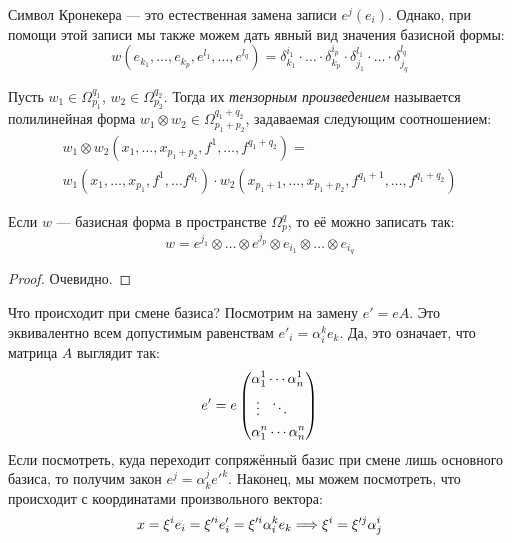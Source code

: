 \begin{note}
	Символ Кронекера --- это естественная замена записи $e^j(e_i)$. Однако, при помощи этой записи мы также можем дать явный вид значения базисной формы:
	\[
		w(e_{k_1}, \ldots, e_{k_p}, e^{l_1}, \ldots, e^{l_q}) = \delta_{k_1}^{i_1} \cdot \ldots \cdot \delta_{k_p}^{i_p} \cdot \delta_{j_1}^{l_1} \cdot \ldots \cdot \delta_{j_q}^{l_q}
	\]
\end{note}

\begin{definition}
	Пусть $w_1 \in \Omega_{p_1}^{q_1}$, $w_2 \in \Omega_{p_2}^{q_2}$. Тогда их \textit{тензорным произведением} называется полилинейная форма $w_1 \otimes w_2 \in \Omega_{p_1 + p_2}^{q_1 + q_2}$, задаваемая следующим соотношением:
	\begin{multline*}
		w_1 \otimes w_2(x_1, \ldots, x_{p_1 + p_2}, f^1, \ldots, f^{q_1 + q_2}) =
		\\
		w_1(x_1, \ldots, x_{p_1}, f^1, \ldots f^{q_1}) \cdot w_2(x_{p_1 + 1}, \ldots, x_{p_1 + p_2}, f^{q_1 + 1}, \ldots, f^{q_1 + q_2})
	\end{multline*}
\end{definition}

\begin{proposition}
	Если $w$ --- базисная форма в пространстве $\Omega_p^q$, то её можно записать так:
	\[
		w = e^{j_1} \otimes \ldots \otimes e^{j_p} \otimes e_{i_1} \otimes \ldots \otimes e_{i_q}
	\]
\end{proposition}

\begin{proof}
	Очевидно.
\end{proof}

\begin{note}
	Что происходит при смене базиса? Посмотрим на замену $e' = eA$. Это эквивалентно всем допустимым равенствам $e'_i = \alpha_i^k e_k$. Да, это означает, что матрица $A$ выглядит так:
	\[
		e' = e\left(\begin{aligned}
			&{\alpha_1^1 \cdots \alpha_n^1}
			\\
			&{\ \vdots\ \ \ddots}
			\\
			&{\alpha_1^n \cdots \alpha_n^n}
		\end{aligned}\right)
	\]
	Если посмотреть, куда переходит сопряжённый базис при смене лишь основного базиса, то получим закон $e^j = \alpha_k^j e'^k$. Наконец, мы можем посмотреть, что происходит с координатами произвольного вектора:
	\[
		x = \xi^i e_i = \xi'^i e'_i = \xi'^i \alpha_i^k e_k \Longrightarrow \xi^i = \xi'^j\alpha_j^i
	\]
\end{note}

